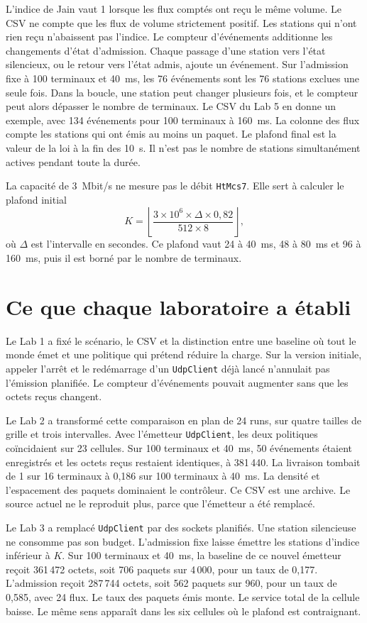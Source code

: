 \documentclass[11pt,a4paper]{article}
\begin{document}
L'indice de Jain vaut 1 lorsque les flux comptés ont reçu le même volume. Le CSV ne compte que les flux de volume strictement positif. Les stations qui n'ont rien reçu n'abaissent pas l'indice. Le compteur d'événements additionne les changements d'état d'admission. Chaque passage d'une station vers l'état silencieux, ou le retour vers l'état admis, ajoute un événement. Sur l'admission fixe à 100 terminaux et 40~ms, les 76 événements sont les 76 stations exclues une seule fois. Dans la boucle, une station peut changer plusieurs fois, et le compteur peut alors dépasser le nombre de terminaux. Le CSV du Lab 5 en donne un exemple, avec 134 événements pour 100 terminaux à 160~ms. La colonne des flux compte les stations qui ont émis au moins un paquet. Le plafond final est la valeur de la loi à la fin des 10~s. Il n'est pas le nombre de stations simultanément actives pendant toute la durée.

La capacité de 3~Mbit/s ne mesure pas le débit \texttt{HtMcs7}. Elle sert à calculer le plafond initial
\[
  K = \left\lfloor \frac{3\times 10^{6}\times \Delta \times 0{,}82}{512 \times 8} \right\rfloor,
\]
où $\Delta$ est l'intervalle en secondes. Ce plafond vaut 24 à 40~ms, 48 à 80~ms et 96 à 160~ms, puis il est borné par le nombre de terminaux.

\section{Ce que chaque laboratoire a établi}

Le Lab 1 a fixé le scénario, le CSV et la distinction entre une baseline où tout le monde émet et une politique qui prétend réduire la charge. Sur la version initiale, appeler l'arrêt et le redémarrage d'un \texttt{UdpClient} déjà lancé n'annulait pas l'émission planifiée. Le compteur d'événements pouvait augmenter sans que les octets reçus changent.

Le Lab 2 a transformé cette comparaison en plan de 24 runs, sur quatre tailles de grille et trois intervalles. Avec l'émetteur \texttt{UdpClient}, les deux politiques coïncidaient sur 23 cellules. Sur 100 terminaux et 40~ms, 50 événements étaient enregistrés et les octets reçus restaient identiques, à 381\,440. La livraison tombait de 1 sur 16 terminaux à 0,186 sur 100 terminaux à 40~ms. La densité et l'espacement des paquets dominaient le contrôleur. Ce CSV est une archive. Le source actuel ne le reproduit plus, parce que l'émetteur a été remplacé.

Le Lab 3 a remplacé \texttt{UdpClient} par des sockets planifiés. Une station silencieuse ne consomme pas son budget. L'admission fixe laisse émettre les stations d'indice inférieur à $K$. Sur 100 terminaux et 40~ms, la baseline de ce nouvel émetteur reçoit 361\,472 octets, soit 706 paquets sur 4\,000, pour un taux de 0,177. L'admission reçoit 287\,744 octets, soit 562 paquets sur 960, pour un taux de 0,585, avec 24 flux. Le taux des paquets émis monte. Le service total de la cellule baisse. Le même sens apparaît dans les six cellules où le plafond est contraignant.
\end{document}
